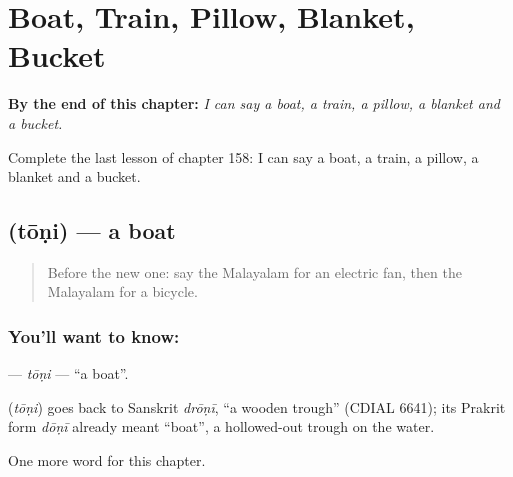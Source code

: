 
\chapter{Boat, Train, Pillow, Blanket, Bucket}
\label{ch:ml-boat-train-pillow-blanket-bucket}

\begin{chapteropening}
\textbf{By the end of this chapter:} \emph{I can say a boat, a train, a pillow, a blanket and a bucket.}

Complete the last lesson of chapter 158: I can say a boat, a train, a pillow, a blanket and a bucket.
\end{chapteropening}

\section[\texorpdfstring{\ml{തോണി} (tōṇi)}{തോണി (tōṇi)}]{ (tōṇi) — a boat}

\label{lesson:ML-C158-toni}



\begin{quote}
Before the new one: say the Malayalam for an electric fan, then the Malayalam for a bicycle.
\end{quote}

\subsection*{You'll want to know: }
\textbf{} — \emph{tōṇi} — \textquotedblleft{}a boat\textquotedblright{}.

\begin{cousinweb}
\textbf{} (\emph{tōṇi}) goes back to Sanskrit \emph{drōṇī}, \textquotedblleft{}a wooden trough\textquotedblright{} (CDIAL 6641); its Prakrit form \emph{dōṇī} already meant \textquotedblleft{}boat\textquotedblright{}, a hollowed-out trough on the water.
\end{cousinweb}

\begin{grammarlens}[title={What you've built}]
One more word for this chapter.
\end{grammarlens}

